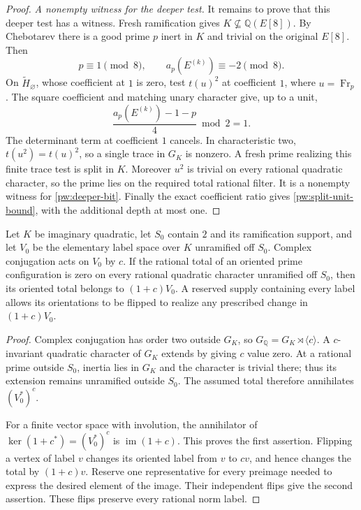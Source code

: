 \begin{proof}
\emph{A nonempty witness for the deeper test.}
It remains to prove that this deeper test has a witness.  Fresh
ramification gives $K\not\subseteq\mathbb Q(E[8])$.  By Chebotarev there
is a good prime $p$ inert in $K$ and trivial on the original $E[8]$.
Then
\[
 p\equiv1\pmod8,\qquad a_p(E^{(k)})\equiv-2\pmod8.
\]
On $\widetilde H_\varnothing$, whose coefficient at $1$ is zero, test
$t(u)^2$ at coefficient $1$, where $u=\operatorname{Fr}_p$.  The square
coefficient and matching unary character give, up to a unit,
\[
 \frac{a_p(E^{(k)})-1-p}{4}\bmod2=1.
\]
The determinant term at coefficient $1$ cancels.  In characteristic two,
$t(u^2)=t(u)^2$, so a single trace in $G_K$ is nonzero.  A fresh prime
realizing this finite trace test is split in $K$.  Moreover $u^2$ is
trivial on every rational quadratic character, so the prime lies on the
required total rational filter.  It is a nonempty witness for
\eqref{pw:deeper-bit}.  Finally the exact coefficient ratio gives
\eqref{pw:split-unit-bound}, with the additional depth at most one.
\end{proof}

\begin{lemma}\label{pw:coinvariants}
Let $K$ be imaginary quadratic, let $S_0$ contain $2$ and its ramification
support, and let $V_0$ be the elementary label space over $K$ unramified
off $S_0$.  Complex conjugation acts on $V_0$ by $c$.  If the rational
total of an oriented prime configuration is zero on every rational
quadratic character unramified off $S_0$, then its oriented total belongs
to $(1+c)V_0$.  A reserved supply containing every label allows its
orientations to be flipped to realize any prescribed change in
$(1+c)V_0$.
\end{lemma}

\begin{proof}
Complex conjugation has order two outside $G_K$, so
$G_{\mathbb Q}=G_K\rtimes\langle c\rangle$.  A $c$-invariant quadratic
character of $G_K$ extends by giving $c$ value zero.  At a rational prime
outside $S_0$, inertia lies in $G_K$ and the character is trivial there;
thus its extension remains unramified outside $S_0$.  The assumed total
therefore annihilates $(V_0^*)^c$.

For a finite vector space with involution, the annihilator of
$\ker(1+c^*)=(V_0^*)^c$ is $\operatorname{im}(1+c)$.  This proves the
first assertion.  Flipping a vertex of label $v$ changes its oriented
label from $v$ to $cv$, and hence changes the total by $(1+c)v$.
Reserve one representative for every preimage needed to express the
desired element of the image.  Their independent flips give the second
assertion.  These flips preserve every rational norm label.
\end{proof}

